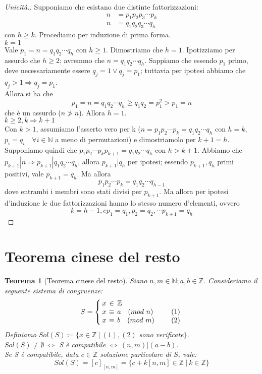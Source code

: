 \documentclass[12pt]{article}
\newcommand{\N}{\mathbb{N}}
\newcommand{\Z}{\mathbb{Z}}
\newcommand{\sesolose}{\Leftrightarrow}
\newcommand{\implica}{\Longrightarrow}
\renewcommand\qedsymbol{$\blacksquare$}
\newtheorem{theorem}{Teorema}
\begin{document}
\renewcommand\qedsymbol{$\blacksquare$}
\begin{proof}[Unicità.]
	Supponiamo che esistano due distinte fattorizzazioni:
	\begin{align*}
		n & = p_1 p_2 p_3 \cdots p_k \\
		n & = q_1 q_2 q_3 \cdots q_h
	\end{align*}
	con $h \ge k$. Procediamo per induzione di prima forma.
	\\[1\baselineskip]{\boldmath$k = 1$}
	\\Vale $p_1 = n = q_1 q_2 \cdots q_h$ con $h \ge 1$. Dimostriamo che $h = 1$. Ipotizziamo per assurdo che $ h \ge 2$; avremmo che $ n = q_1 q_2 \cdots q_h$. Sappiamo che essendo $p_1$ primo, deve necessariamente essere $ q_j = 1 \lor q_j = p_1$; tuttavia per ipotesi abbiamo che $q_j > 1 \implica q_j = p_1$.
	\\Allora si ha che
	$$ p_1 = n = q_1 q_2 \cdots q_h \ge q_1 q_2 = p^2_1 > p_1 = n $$
	che è un assurdo ($n \ngtr n$). Allora $h = 1$.
	\\[1\baselineskip]{\boldmath$k \ge 2, k \implica k+1$}
	\\Con $ k > 1 $, assumiamo l'asserto vero per k ($n = p_1 p_2 \cdots p_k = q_1 q_2 \cdots q_h$ con $h = k$, $p_i = q_i \quad\forall i \in \N$ a meno di permutazioni) e dimostriamolo per $k + 1 = h$. Supponiamo quindi che $p_1 p_2 \cdots p_k p_{k+1} = q_1 q_2 \cdots q_h$ con $h > k + 1$. Abbiamo che $p_{k+1} | n \implica p_{k+1} | q_1 q_2 \cdots q_h$, allora $p_{k+1} | q_h$ per ipotesi; essendo $p_{k+1}, q_h$ primi positivi, vale $p_{k+1} = q_h$. Ma allora
	$$p_1 p_2 \cdots p_k = q_1 q_2 \cdots q_{h-1} $$
	dove entrambi i membri sono stati divisi per $p_{k+1}$. Ma allora per ipotesi d'induzione le due fattorizzazioni hanno lo stesso numero d'elementi, ovvero
	$$k = h - 1, e p_1 = q_1, p_2 = q_2, \cdots p_{k+1} = q_h$$
\end{proof}

\section{Teorema cinese del resto}
\begin{theorem}[Teorema cinese del resto]
	Siano $n, m \in \N; a, b \in \Z$. Consideriamo il seguente sistema di congruenze:
	\[
		S = \left\{
		\setlength\arraycolsep{2pt}
		\begin{array}{rclc} x & \in & \Z & \\ x & \equiv &a\quad (mod\ n) &\qquad (1) \\ x & \equiv& b\quad (mod \ m)& \qquad (2)
		\end{array}\right
		.
	\]
	Definiamo $Sol(S) \coloneqq \{ x \in \Z \ |\ (1), (2)$ sono verificate$\}$.
	\\ $Sol(S) \ne \emptyset \ \sesolose$ S è compatibile $ \sesolose \ (n,m) | (a-b)$.
	\\ Se S è compatibile, data $c \in \Z$ soluzione particolare di $S$, vale:
	$$Sol(S) = [c]_{[n,m]} = \{ c + k[n,m] \in \Z \ |\ k \in \Z\}$$
\end{theorem}
\end{document}
